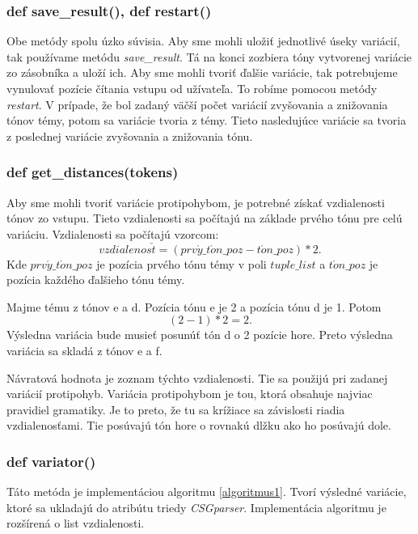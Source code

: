 \subsubsection*{def save\_result(), def restart()}
Obe metódy spolu úzko súvisia. Aby sme mohli uložiť jednotlivé úseky variácií, tak používame metódu \textit{save\_result}. Tá na konci zozbiera tóny vytvorenej variácie zo zásobníka a uloží ich. Aby sme mohli tvoriť ďalšie variácie, tak potrebujeme vynulovať pozície čítania vstupu od užívateľa. To robíme pomocou metódy \textit{restart}. V prípade, že bol zadaný väčší počet variácií zvyšovania a znižovania tónov témy, potom sa variácie tvoria z témy. Tieto nasledujúce variácie sa tvoria z poslednej variácie zvyšovania a znižovania tónu.

\subsubsection*{def get\_distances(tokens)}
Aby sme mohli tvoriť variácie protipohybom, je potrebné získať vzdialenosti tónov zo vstupu. Tieto vzdialenosti sa počítajú na základe prvého tónu pre celú variáciu. Vzdialenosti sa počítajú vzorcom: $$vzdialenos\check{t} = (prv\acute{y}\_t\acute{o}n\_poz - t\acute{o}n\_poz) * 2.$$ Kde $prv\acute{y}\_t\acute{o}n\_poz$ je pozícia prvého tónu témy v poli $tuple\_list$ a $t\acute{o}n\_poz$ je pozícia každého ďalšieho tónu témy.

\begin{example}
Majme tému z tónov e a d. Pozícia tónu e je 2 a pozícia tónu d je 1. Potom $$(2 - 1) * 2 = 2.$$ Výsledna variácia bude musieť posunúť tón d o 2 pozície hore. Preto výsledna variácia sa skladá z tónov e a f.
\end{example}

Návratová hodnota je zoznam týchto vzdialenosti. Tie sa použijú pri zadanej variácií protipohyb. Variácia protipohybom je tou, ktorá obsahuje najviac pravidiel gramatiky. Je to preto, že tu sa krížiace sa závislosti riadia vzdialenosťami. Tie posúvajú tón hore o rovnakú dlžku ako ho posúvajú dole.

\subsubsection*{def variator()}
Táto metóda je implementáciou algoritmu \ref{algoritmus1}. Tvorí výsledné variácie, ktoré sa ukladajú do atribútu triedy \textit{CSGparser}. Implementácia algoritmu je rozšírená o list vzdialenosti. 


